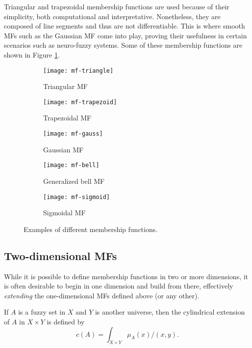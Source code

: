 Triangular and trapezoidal membership functions are used because of their simplicity, both computational and interpretative. Nonetheless, they are composed of line segments and thus are not differentiable. This is where smooth MFs such as the Gaussian MF come into play, proving their usefulness in certain scenarios such as neuro-fuzzy systems. Some of these membership functions are shown in Figure \ref{fig:mfs}.


\begin{figure}[h!]
    \centering
    \begin{subfigure}[b]{0.4\textwidth}
        \texttt{[image: mf-triangle]}
        \caption{Triangular MF}
    \end{subfigure}
    \begin{subfigure}[b]{0.4\textwidth}
        \texttt{[image: mf-trapezoid]}
        \caption{Trapezoidal MF}
    \end{subfigure}
    \begin{subfigure}[b]{0.4\textwidth}
        \texttt{[image: mf-gauss]}
        \caption{Gaussian MF}
    \end{subfigure}
    \begin{subfigure}[b]{0.4\textwidth}
        \texttt{[image: mf-bell]}
        \caption{Generalized bell MF}
    \end{subfigure}
    \begin{subfigure}[b]{0.4\textwidth}
        \vspace{.5em}
        \texttt{[image: mf-sigmoid]}
        \caption{Sigmoidal MF}
    \end{subfigure}
    \caption{Examples of different membership functions.}
    \label{fig:mfs}
\end{figure}


\subsection{Two-dimensional MFs}

While it is possible to define membership functions in two or more dimensions, it is often desirable to begin in one dimension and build from there, effectively \textit{extending} the one-dimensional MFs defined above (or any other).

\begin{definition} If $A$ is a fuzzy set in $X$ and $Y$ is another universe, then the cylindrical extension of $A$ in $X \times Y$ is defined by
\[
c(A) = \int_{X\times Y} \mu_A(x) \slash (x,y).
\]

\end{definition}

